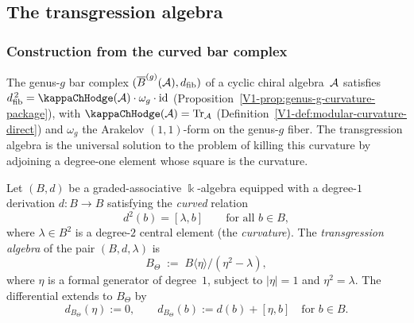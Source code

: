 %
%

\subsection{The transgression algebra}

\subsubsection{Construction from the curved bar complex}

The genus-$g$ bar complex $(\overline{B}^{(g)}(\mathcal{A}), d_{\mathrm{fib}})$ of a cyclic
chiral algebra~$\mathcal{A}$ satisfies
$\dfib^{\,2} = \kappaChHodge(\cA) \cdot \omega_g \cdot \id$
(Proposition~\ref{V1-prop:genus-g-curvature-package}),
with $\kappaChHodge(\cA) = \mathrm{Tr}_\cA$
(Definition~\ref{V1-def:modular-curvature-direct}) and $\omega_g$ the
Arakelov $(1,1)$-form on the genus-$g$ fiber.
The transgression algebra is the universal solution to the
problem of killing this curvature by adjoining a degree-one
element whose square is the curvature.

\begin{definition}
Let $(B, d)$ be a graded-associative $\Bbbk$-algebra
equipped with a degree-$1$ derivation $d\colon B \to B$ satisfying the
\emph{curved} relation
\begin{equation}%
d^2(b) = [\lambda, b]
\qquad
\text{for all } b \in B,
\end{equation}
where $\lambda \in B^2$ is a degree-$2$ central element (the
\emph{curvature}). The \emph{transgression algebra} of the pair
$(B, d, \lambda)$ is
\begin{equation}%
B_\Theta
\;:=\;
B\langle \eta \rangle \big/ (\eta^2 - \lambda),
\end{equation}
where $\eta$ is a formal generator of degree~$1$, subject to
$|\eta| = 1$ and $\eta^2 = \lambda$. The differential extends to
$B_\Theta$ by
\begin{equation}%
d_{B_\Theta}(\eta) := 0,
\qquad
d_{B_\Theta}(b) := d(b) + [\eta, b]
\quad\text{for } b \in B.
\end{equation}
\end{definition}

